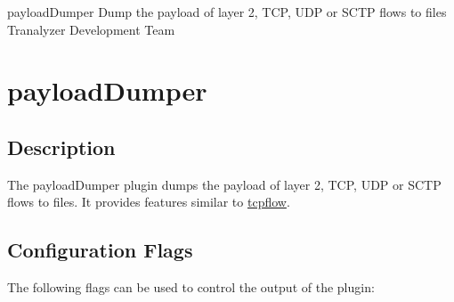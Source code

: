 \documentclass[documentation]{subfiles}
\begin{document}
\trantitle
    {payloadDumper} %
    {Dump the payload of layer 2, TCP, UDP or SCTP flows to files} %
    {Tranalyzer Development Team} %

\section{payloadDumper}\label{s:payloadDumper}

\subsection{Description}
The payloadDumper plugin dumps the payload of layer 2, TCP, UDP or SCTP flows to files.
It provides features similar to \href{https://github.com/simsong/tcpflow}{tcpflow}.

\subsection{Configuration Flags}
The following flags can be used to control the output of the plugin:
\end{document}

